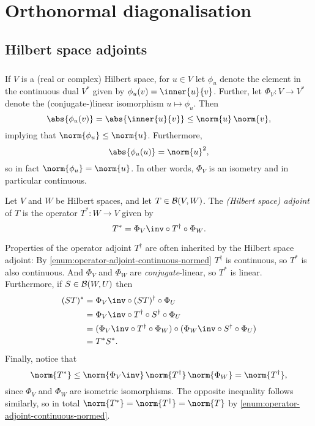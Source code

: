 \documentclass[a4paper, 11pt]{memoir}
\numberwithin{equation}{chapter}
\newcommand{\newpar}{\paragraph{}}
\begin{document}
\chapter{Orthonormal diagonalisation}

\section{Hilbert space adjoints}\label{mylabel2}

\newpar\label{mylabel}

If $V$ is a (real or complex) Hilbert space, for $u \in V$ let $\phi_u$ denote the element in the continuous dual $V^*$ given by $\phi_u(v) = \inner{u}{v}$. Further, let $\Phi_V \colon V \to V^*$ denote the (conjugate-)linear isomorphism $u \mapsto \phi_u$. Then
%
\begin{equation*}
    \abs{\phi_u(v)}
        = \abs{\inner{u}{v}}
        \leq \norm{u} \, \norm{v},
\end{equation*}
%
implying that $\norm{\phi_u} \leq \norm{u}$. Furthermore,
%
\begin{equation*}
    \abs{\phi_u(u)}
        = \norm{u}^2,
\end{equation*}
%
so in fact $\norm{\phi_u} = \norm{u}$. In other words, $\Phi_V$ is an isometry and in particular continuous.

\begin{definition}
    Let $V$ and $W$ be Hilbert spaces, and let $T \in \mathcal{B}(V,W)$. The \emph{(Hilbert space) adjoint} of $T$ is the operator $T^* \colon W \to V$ given by
    \begin{equation*}
        T^*
            = \Phi_V\inv \circ T^\dagger \circ \Phi_W.
    \end{equation*}
\end{definition}
%
Properties of the operator adjoint $T^\dagger$ are often inherited by the Hilbert space adjoint: By \cref{enum:operator-adjoint-continuous-normed} $T^\dagger$ is continuous, so $T^*$ is also continuous. And $\Phi_V$ and $\Phi_W$ are \emph{conjugate}-linear, so $T^*$ is linear. Furthermore, if $S \in \mathcal{B}(W,U)$ then
%
\begin{align*}
    (ST)^*
        &= \Phi_V\inv \circ (ST)^\dagger \circ \Phi_U \\
        &= \Phi_V\inv \circ T^\dagger \circ S^\dagger \circ \Phi_U \\
        &= (\Phi_V\inv \circ T^\dagger \circ \Phi_W) \circ (\Phi_W\inv \circ S^\dagger \circ \Phi_U) \\
        &= T^* S^*.
\end{align*}
%
Finally, notice that
%
\begin{equation*}
    \norm{T^*}
        \leq \norm{\Phi_V\inv} \, \norm{T^\dagger} \, \norm{\Phi_W}
        = \norm{T^\dagger},
\end{equation*}
%
since $\Phi_V$ and $\Phi_W$ are isometric isomorphisms. The opposite inequality follows similarly, so in total $\norm{T^*} = \norm{T^\dagger} = \norm{T}$ by \cref{enum:operator-adjoint-continuous-normed}.
\end{document}
